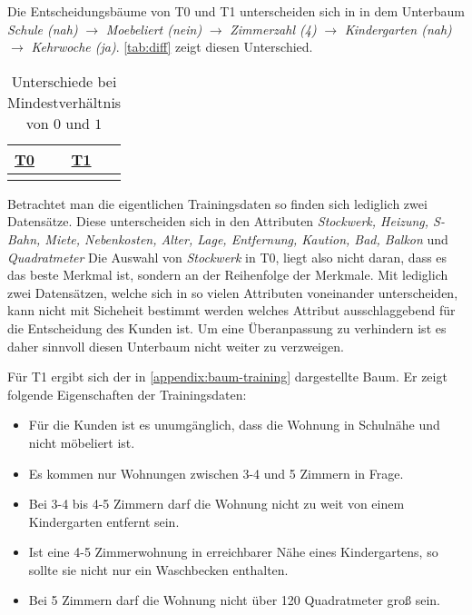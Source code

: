Die Entscheidungsbäume von T0 und T1 unterscheiden sich in in dem Unterbaum
\emph{Schule (nah)} $\rightarrow$ \emph{Moebeliert (nein)} $\rightarrow$ \emph{Zimmerzahl (4)} $\rightarrow$ \emph{Kindergarten (nah)} $\rightarrow$ \emph{Kehrwoche (ja)}.
\autoref{tab:diff} zeigt diesen Unterschied.

\useunder{\uline}{\ul}{}
\begin{table}[h]
    \begin{center}
        \begin{tabular}{|p{6cm}|p{6cm}|}
        \hline
            {\ul \textbf{T0}}   & {\ul \textbf{T1}} \\
            \hline
            {}
            &
            {}
            \\
            \hline
        \end{tabular}
        \caption{Unterschiede bei Mindestverhältnis von $0$ und $1$}
        \label{tab:diff}
    \end{center}
\end{table}

Betrachtet man die eigentlichen Trainingsdaten so finden sich lediglich zwei Datensätze.
Diese unterscheiden sich in den Attributen \emph{Stockwerk, Heizung, S-Bahn, Miete, Nebenkosten, Alter, Lage, Entfernung, Kaution, Bad, Balkon} und \emph{Quadratmeter}
Die Auswahl von \emph{Stockwerk} in T0, liegt also nicht daran,
dass es das beste Merkmal ist, sondern an der Reihenfolge der Merkmale.
Mit lediglich zwei Datensätzen, welche sich in so vielen Attributen voneinander unterscheiden,
kann nicht mit Sicheheit bestimmt werden welches Attribut ausschlaggebend für die Entscheidung des Kunden ist.
Um eine Überanpassung zu verhindern ist es daher sinnvoll diesen Unterbaum nicht weiter zu verzweigen.

Für T1 ergibt sich der in \autoref{appendix:baum-training} dargestellte Baum.
Er zeigt folgende Eigenschaften der Trainingsdaten:
\begin{itemize}
    \item Für die Kunden ist es unumgänglich, dass die Wohnung in Schulnähe und nicht möbeliert ist.
    \item Es kommen nur Wohnungen zwischen 3-4 und 5 Zimmern in Frage.
    \item Bei 3-4 bis 4-5 Zimmern darf die Wohnung nicht zu weit von einem Kindergarten entfernt sein.
    \item Ist eine 4-5 Zimmerwohnung in erreichbarer Nähe eines Kindergartens, so sollte sie nicht nur ein Waschbecken enthalten.
    \item Bei 5 Zimmern darf die Wohnung nicht über 120 Quadratmeter groß sein.
\end{itemize}

